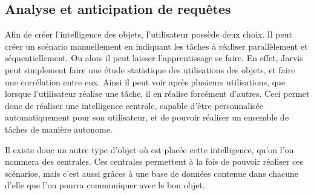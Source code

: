 	\subsection{Analyse et anticipation de requêtes}
Afin de créer l'intelligence des objets, l'utilisateur possède deux choix. Il peut créer un scénario manuellement en indiquant les tâches à réaliser parallèlement et séquentiellement. Ou alors il peut laisser l'apprentissage se faire. En effet, Jarvis peut simplement faire une étude statistique des utilisations des objets, et faire une corrélation entre eux. Ainsi il peut voir après plusieurs utilisations, que lorsque l'utilisateur réalise une tâche, il en réalise forcément d'autres. Ceci permet donc de réaliser une intelligence centrale, capable d'être personnalisée automatiquement pour son utilisateur, et de pouvoir réaliser un ensemble de tâches de manière autonome.

Il existe donc un autre type d'objet où est placée cette intelligence, qu'on l'on nommera des centrales. Ces centrales permettent à la fois de pouvoir réaliser ces scénarios, mais c'est aussi grâces à une base de données contenue dans chacune d'elle que l'on pourra communiquer avec le bon objet.
